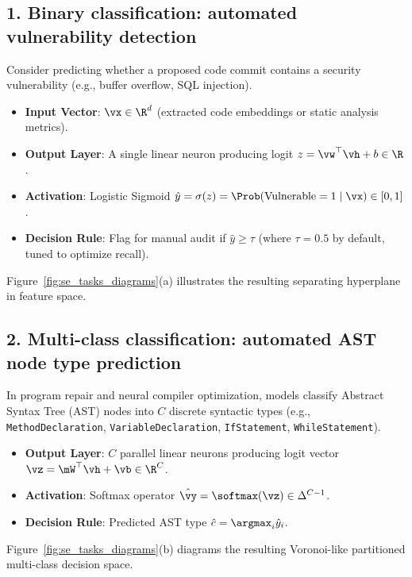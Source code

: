 \documentclass[../../main.tex]{subfiles}
\begin{document}
\subsection{1. Binary classification: automated vulnerability detection}
Consider predicting whether a proposed code commit contains a security vulnerability (e.g., buffer overflow, SQL injection).
\begin{itemize}
    \item \textbf{Input Vector}: $\vx \in \R^{d}$ (extracted code embeddings or static analysis metrics).
    \item \textbf{Output Layer}: A single linear neuron producing logit $z = \vw^\top \vh + b \in \R$.
    \item \textbf{Activation}: Logistic Sigmoid $\hat{y} = \sigma(z) = \Prob(\text{Vulnerable} = 1 \mid \vx) \in [0, 1]$.
    \item \textbf{Decision Rule}: Flag for manual audit if $\hat{y} \ge \tau$ (where $\tau = 0.5$ by default, tuned to optimize recall).
\end{itemize}
Figure~\ref{fig:se_tasks_diagrams}(a) illustrates the resulting separating hyperplane in feature space.

\subsection{2. Multi-class classification: automated AST node type prediction}
In program repair and neural compiler optimization, models classify Abstract Syntax Tree (AST) nodes into $C$ discrete syntactic types (e.g., \texttt{MethodDeclaration}, \texttt{VariableDeclaration}, \texttt{IfStatement}, \texttt{WhileStatement}).
\begin{itemize}
    \item \textbf{Output Layer}: $C$ parallel linear neurons producing logit vector $\vz = \mW^\top \vh + \vb \in \R^C$.
    \item \textbf{Activation}: Softmax operator $\hat{\vy} = \softmax(\vz) \in \Delta^{C-1}$.
    \item \textbf{Decision Rule}: Predicted AST type $\hat{c} = \argmax_{i} \hat{y}_i$.
\end{itemize}
Figure~\ref{fig:se_tasks_diagrams}(b) diagrams the resulting Voronoi-like partitioned multi-class decision space.
\end{document}
